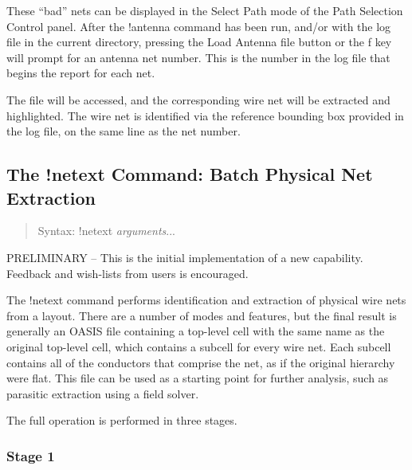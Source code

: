 These ``bad'' nets can be displayed in the {\cb Select Path} mode of
the {\cb Path Selection Control} panel.  After the {\cb !antenna}
command has been run, and/or with the log file in the current
directory, pressing the {\cb Load Antenna file} button or the {\kb f}
key will prompt for an antenna net number.  This is the number in the
log file that begins the report for each net.

The file will be accessed, and the corresponding wire net will be
extracted and highlighted.  The wire net is identified via the
reference bounding box provided in the log file, on the same line as
the net number.


\subsection{The {\cb !netext} Command: Batch Physical Net Extraction}
\begin{quote}
Syntax: {\vt !netext} {\it arguments\/}...
\end{quote}
PRELIMINARY -- This is the initial implementation of a new capability. 
Feedback and wish-lists from users is encouraged.

The {\cb !netext} command performs identification and extraction of
physical wire nets from a layout.  There are a number of modes and
features, but the final result is generally an OASIS file containing a
top-level cell with the same name as the original top-level cell,
which contains a subcell for every wire net.  Each subcell contains
all of the conductors that comprise the net, as if the original
hierarchy were flat.  This file can be used as a starting point for
further analysis, such as parasitic extraction using a field solver.

The full operation is performed in three stages.

\subsubsection{Stage 1}

